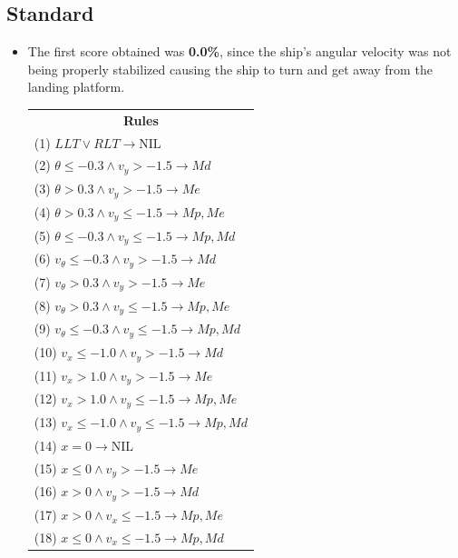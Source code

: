 \documentclass[a4paper, 12pt, fleqn]{report}
\begin{document}
\subsection*{Standard}
\begin{itemize}
    \item The first score obtained was \textbf{0.0\%}, since the ship's angular velocity was not being properly stabilized causing the ship to turn and get away from the landing platform.
    \begin{table}[h!]
        \begin{tabular}{p{16cm}} 

        \multicolumn{1}{c}{\textbf{Rules}} \\ 

        (1) $LLT \lor RLT \rightarrow \text{NIL}$ \\
        
        (2) $\theta \leq -0.3 \land v_y > -1.5 \rightarrow Md$ \\ 
        (3) $\theta > 0.3 \land v_y > -1.5 \rightarrow Me$ \\  
        (4) $\theta > 0.3 \land v_y \leq -1.5 \rightarrow Mp, Me$ \\  
        (5) $\theta \leq -0.3 \land v_y \leq -1.5 \rightarrow Mp, Md$ \\
    
        (6) $v_\theta \leq -0.3 \land v_y > -1.5 \rightarrow Md$ \\ 
        (7) $v_\theta > 0.3 \land v_y > -1.5 \rightarrow Me$ \\  
        (8) $v_\theta > 0.3 \land v_y \leq -1.5 \rightarrow Mp, Me$\\  
        (9) $v_\theta \leq -0.3 \land v_y \leq -1.5 \rightarrow Mp, Md$ \\ 
        
        (10) $v_x \leq -1.0  \land v_y > -1.5 \rightarrow Md$ \\ 
        (11) $v_x > 1.0  \land v_y > -1.5 \rightarrow Me$ \\  
        (12) $v_x > 1.0 \land v_y \leq -1.5 \rightarrow Mp, Me$ \\  
        (13) $v_x \leq -1.0 \land v_y \leq -1.5 \rightarrow Mp, Md$ \\
    
        (14) $x = 0 \rightarrow \text{NIL}$ \\ 
        (15) $x \leq 0  \land v_y > -1.5 \rightarrow  Me$ \\  
        (16) $x > 0  \land v_y > -1.5 \rightarrow  Md$ \\  
        (17) $x > 0 \land v_x \leq -1.5 \rightarrow Mp, Me$ \\  
        (18) $x \leq 0 \land v_x \leq -1.5 \rightarrow Mp, Md$ \\ 
    

\end{tabular}
\end{table}
\end{itemize}
\end{document}
